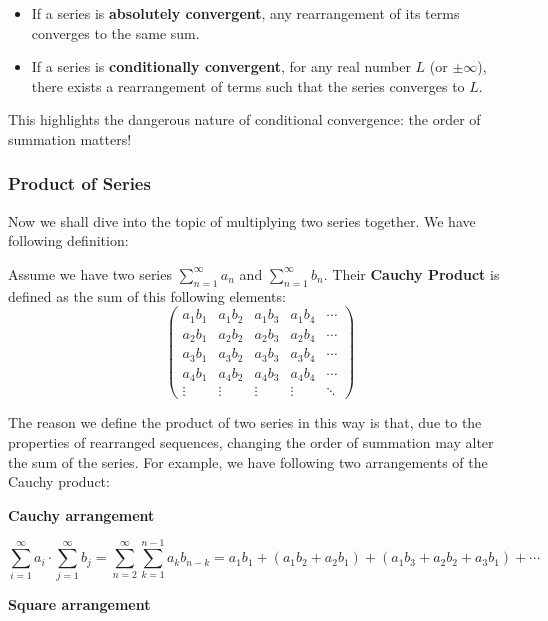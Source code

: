 \begin{theorem}
\begin{itemize}
    \item If a series is \textbf{absolutely convergent}, any rearrangement of its terms converges to the same sum.
    \item If a series is \textbf{conditionally convergent}, for any real number $L$ (or $\pm \infty$), there exists a rearrangement of terms such that the series converges to $L$.
\end{itemize}
This highlights the dangerous nature of conditional convergence: the order of summation matters!
\end{theorem}

\subsubsection{Product of Series}
Now we shall dive into the topic of multiplying two series together. We have following definition:

\begin{definition}
    Assume we have two series $\sum_{n=1}^{\infty} a_n$ and $\sum_{n=1}^{\infty} b_n$. Their \textbf{Cauchy Product} is defined as the sum of this following elements:
    \[\begin{pmatrix}
        a_1 b_1 & a_1 b_2 & a_1 b_3 & a_1 b_4 & \cdots \\
        a_2 b_1 & a_2 b_2 & a_2 b_3 & a_2 b_4 & \cdots \\
        a_3 b_1 & a_3 b_2 & a_3 b_3 & a_3 b_4 & \cdots \\
        a_4 b_1 & a_4 b_2 & a_4 b_3 & a_4 b_4 & \cdots \\
    \vdots   & \vdots   & \vdots   & \vdots   & \ddots
    \end{pmatrix}\]
\end{definition}

The reason we define the product of two series in this way is that, due to the properties of rearranged sequences, changing the order of summation may alter the sum of the series. For example, we have following two arrangements of the Cauchy product:

\textbf{Cauchy arrangement}

\[
\sum_{i=1}^{\infty} a_i \cdot \sum_{j=1}^{\infty} b_j = \sum_{n=2}^{\infty} \sum_{k=1}^{n-1} a_k b_{n-k} = a_1 b_1 + (a_1 b_2 + a_2 b_1) + (a_1 b_3 + a_2 b_2 + a_3 b_1) + \cdots
\]

\textbf{Square arrangement}

